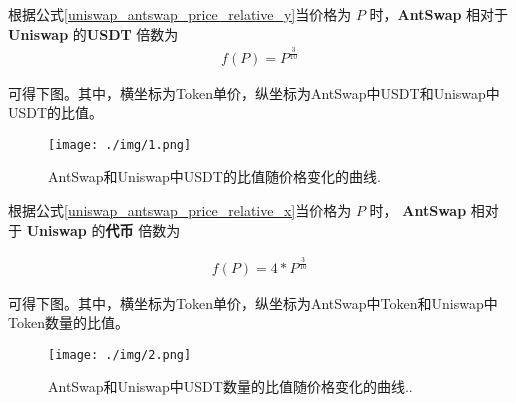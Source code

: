 \documentclass{article}
\begin{document}




根据公式\ref{uniswap_antswap_price_relative_y}当价格为 $P$ 时，\textbf{AntSwap} 相对于 \textbf{Uniswap} 的\textbf{USDT} 倍数为
\begin{equation*}
\begin{split}
f(P) =  P ^ \frac{3}{10} 
\end{split}
\end{equation*}

可得下图。其中，横坐标为Token单价，纵坐标为AntSwap中USDT和Uniswap中USDT的比值。
\begin{figure}[H]
\centering
\texttt{[image: ./img/1.png]}
\caption{\label{fig}AntSwap和Uniswap中USDT的比值随价格变化的曲线.}
\end{figure}


根据公式\ref{uniswap_antswap_price_relative_x}当价格为 $P$ 时， \textbf{AntSwap} 相对于 \textbf{Uniswap} 的\textbf{代币} 倍数为

\begin{equation*}
\begin{split}
f(P) =  4 * P ^ \frac{3}{10} 
\end{split}
\end{equation*}

可得下图。其中，横坐标为Token单价，纵坐标为AntSwap中Token和Uniswap中Token数量的比值。

\begin{figure}[H]
\centering
\texttt{[image: ./img/2.png]}
\caption{\label{fig}AntSwap和Uniswap中USDT数量的比值随价格变化的曲线..}
\end{figure}
\end{document}
